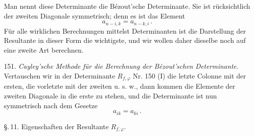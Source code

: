 Man nennt diese Determinante die Bézout'sche Determinante. Sie ist rücksichtlich der zweiten Diagonale symmetrisch; denn es ist das Element
\[ a_{n-i,k} = a_{n-k,i}\,. \]
Für alle wirklichen Berechnungen mittelst Determinanten ist die Darstellung der Resultante in dieser Form die wichtigste, und wir wollen daher dieselbe noch auf eine zweite Art berechnen.

151. \textit{Cayley'sche Methode für die Berechnung der Bézout'schen Determinante.} Vertauschen wir in der Determinante $R_{f,\varphi}$ Nr. 150 (I) die letzte Colonne mit der ersten, die vorletzte mit der zweiten u. s. w., dann kommen die Elemente der zweiten Diagonale in die erste zu stehen, und die Determinante ist nun symmetrisch nach dem Gesetze
\[ a_{ik} = a_{ki}\,. \]


\S.\,11. Eigenschaften der Resultante $R_{f,\varphi}$.

